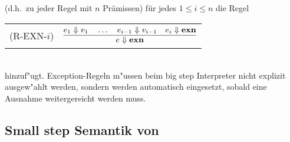 (d.h.\ zu jeder Regel mit $n$ Pr\"amissen) f\"ur jedes $1 \le i \le n$ die Regel \\[3mm]
   \begin{tabular}{ll}
      \mbox{(R-EXN-$i$)} & $\regel{e_1 \eval v_1 \quad \ldots \quad e_{i-1} \eval v_{i-1} \quad e_i \eval \exn}
                                {e \eval \exn}$ \\[5mm]
   \end{tabular}\\[3mm]
hinzuf"ugt. Exception-Regeln m"ussen beim big step Interpreter nicht explizit ausgew"ahlt werden, sondern werden
automatisch eingesetzt, sobald eine Ausnahme weitergereicht werden muss.


\subsection{Small step Semantik von \LONE}

